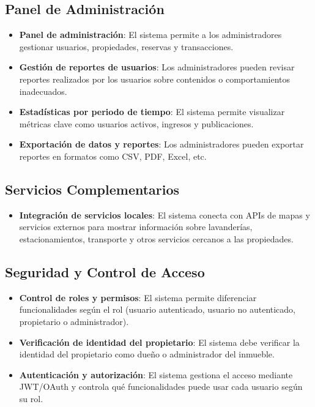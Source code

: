 	\subsection*{Panel de Administración}
		\begin{itemize}
			\item \textbf{Panel de administración}: El sistema permite a los administradores gestionar usuarios, propiedades, reservas y transacciones.
			\item \textbf{Gestión de reportes de usuarios}: Los administradores pueden revisar reportes realizados por los usuarios sobre contenidos o comportamientos inadecuados.
			\item \textbf{Estadísticas por periodo de tiempo}: El sistema permite visualizar métricas clave como usuarios activos, ingresos y publicaciones.
			\item \textbf{Exportación de datos y reportes}: Los administradores pueden exportar reportes en formatos como CSV, PDF, Excel, etc.
		\end{itemize}
	
	\subsection*{Servicios Complementarios}
		\begin{itemize}
			\item \textbf{Integración de servicios locales}: El sistema conecta con APIs de mapas y servicios externos para mostrar información sobre lavanderías, estacionamientos, transporte y otros servicios cercanos a las propiedades.
		\end{itemize}
	
	\subsection*{Seguridad y Control de Acceso}
		\begin{itemize}
			\item \textbf{Control de roles y permisos}: El sistema permite diferenciar funcionalidades según el rol (usuario autenticado, usuario no autenticado, propietario o administrador).
			\item \textbf{Verificación de identidad del propietario}: El sistema debe verificar la identidad del propietario como dueño o administrador del inmueble.
			\item \textbf{Autenticación y autorización}: El sistema gestiona el acceso mediante JWT/OAuth y controla qué funcionalidades puede usar cada usuario según su rol.
		\end{itemize}
	

